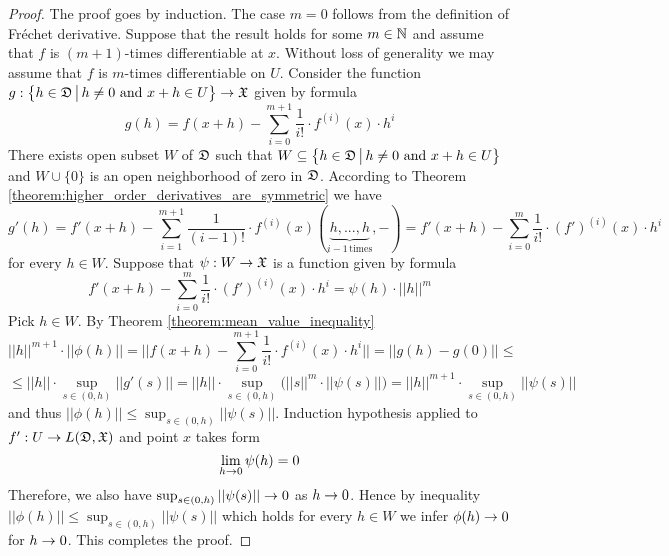 \begin{proof}
The proof goes by induction. The case $m = 0$ follows from the definition of Fr{\'e}chet derivative. Suppose that the result holds for some $m\in {\mathbb N}$ and assume that $f$ is $(m+1)$-times differentiable at $x$. Without loss of generality we may assume that $f$ is $m$-times differentiable on $U$. Consider the function $g:\big\{h\in {\mathfrak D}\,\big|\,h\neq 0\mbox{ and }x+h\in U\big\} \rightarrow {\mathfrak X}$ given by formula 
$$g(h) = f(x + h) - \sum_{i=0}^{m+1}\frac{1}{i!}\cdot f^{(i)}(x)\cdot h^i$$
There exists open subset $W$ of ${\mathfrak D}$ such that $W \subseteq \big\{h\in {\mathfrak D}\,\big|\,h\neq 0\mbox{ and }x+h\in U\big\}$ and $W\cup \{0\}$ is an open neighborhood of zero in ${\mathfrak D}$. According to Theorem \ref{theorem:higher_order_derivatives_are_symmetric} we have
$$g'(h) = f'(x + h) - \sum_{i=1}^{m+1}\frac{1}{(i-1)!}\cdot f^{(i)}(x)\left(\underbrace{h,...,h}_{i-1\,\mathrm{times}},-\right) = f'(x + h) - \sum_{i=0}^{m}\frac{1}{i!}\cdot \left(f'\right)^{(i)}(x)\cdot h^i$$
for every $h \in W$. Suppose that $\psi:W\rightarrow {\mathfrak X}$ is a function given by formula
$$f'(x + h) - \sum_{i=0}^{m}\frac{1}{i!}\cdot \left(f'\right)^{(i)}(x)\cdot h^i = \psi(h)\cdot ||h||^m$$
Pick $h\in W$. By Theorem \ref{theorem:mean_value_inequality}
$$||h||^{m+1}\cdot ||\phi(h)|| = \bigg|\bigg|f(x + h) - \sum_{i=0}^{m+1}\frac{1}{i!}\cdot f^{(i)}(x)\cdot h^i \bigg|\bigg| = ||g(h) - g(0)|| \leq$$
$$\leq ||h||\cdot \sup_{s \in (0,h)}||g'(s)|| = ||h||\cdot \sup_{s \in (0,h)}\bigg(||s||^m \cdot ||\psi(s)||\bigg) = ||h||^{m+1}\cdot \sup_{s \in (0,h)}||\psi(s)||$$
and thus $||\phi(h)||\leq \sup_{s \in (0,h)}||\psi(s)||$. Induction hypothesis applied to $f':U\rightarrow L({\mathfrak D},{\mathfrak X})$ and point $x$ takes form
$$\lim_{h\rightarrow 0}\psi(h) = 0$$
Therefore, we also have $\sup_{s \in (0,h)}||\psi(s)||\rightarrow 0$ as $h\rightarrow 0$. Hence by inequality $||\phi(h)||\leq \sup_{s \in (0,h)}||\psi(s)||$ which holds for every $h\in W$ we infer $\phi(h)\rightarrow 0$ for $h\rightarrow 0$. This completes the proof.
\end{proof}

